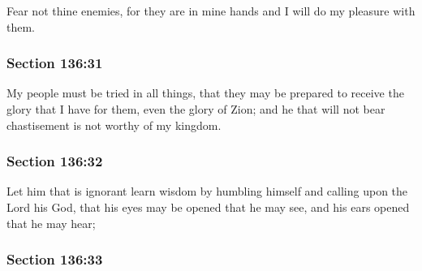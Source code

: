 		Fear not thine enemies, for they are in mine hands and I will do my pleasure with them.


	\subsubsection{Section 136:31} %
		\label{DC136-31}

		My people must be tried in all things, that they may be prepared to receive the glory that I have for them, even the glory of Zion; and he that will not bear chastisement is not worthy of my kingdom.


	\subsubsection{Section 136:32} %
		\label{DC136-32}

		Let him that is ignorant learn wisdom by humbling himself and calling upon the Lord his God, that his eyes may be opened that he may see, and his ears opened that he may hear;


	\subsubsection{Section 136:33} %
		\label{DC136-33}

